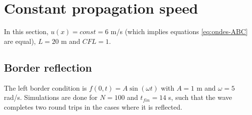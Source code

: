 \documentclass[a4paper,12pt,twoside]{article}
\begin{document}
    \newpage

    \section{Constant propagation speed}
    In this section, $u(x)=const=6$ m/s (which implies equations \eqref{eq:ondes-ABC} are equal), $L=20$ m and $CFL=1$.

    \subsection{Border reflection}
    The left border condition is $f(0,t)=A\sin(\omega t)$ with $A=1$ m and $\omega=5$ rad/s. Simulations are done for $N=100$ and $t_{fin}=14$ s, such that the wave completes two round trips in the cases where it is reflected.
\end{document}

